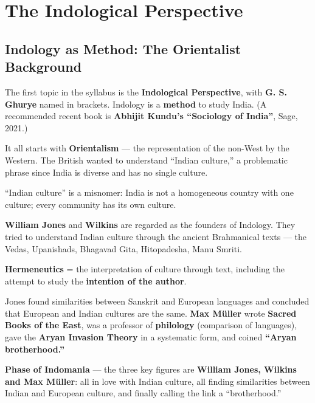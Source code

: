 \chapter{The Indological Perspective}

\section{Indology as Method: The Orientalist Background}

The first topic in the syllabus is the \textbf{Indological Perspective}, with \textbf{G. S. Ghurye} named in brackets. Indology is a \textbf{method} to study India. (A recommended recent book is \textbf{Abhijit Kundu's ``Sociology of India''}, Sage, 2021.)

It all starts with \textbf{Orientalism} --- the representation of the non-West by the Western. The British wanted to understand ``Indian culture,'' a problematic phrase since India is diverse and has no single culture.

\begin{CriticalPoint}
``Indian culture'' is a misnomer: India is not a homogeneous country with one culture; every community has its own culture.
\end{CriticalPoint}

\textbf{William Jones} and \textbf{Wilkins} are regarded as the founders of Indology. They tried to understand Indian culture through the ancient Brahmanical texts --- the Vedas, Upanishads, Bhagavad Gita, Hitopadesha, Manu Smriti.

\begin{KeyConcept}
\textbf{Hermeneutics} = the interpretation of culture through text, including the attempt to study the \textbf{intention of the author}.
\end{KeyConcept}

Jones found similarities between Sanskrit and European languages and concluded that European and Indian cultures are the same. \textbf{Max M\"uller} wrote \textbf{Sacred Books of the East}, was a professor of \textbf{philology} (comparison of languages), gave the \textbf{Aryan Invasion Theory} in a systematic form, and coined \textbf{``Aryan brotherhood.''}

\begin{KeyConcept}
\textbf{Phase of Indomania} --- the three key figures are \textbf{William Jones, Wilkins and Max M\"uller}: all in love with Indian culture, all finding similarities between Indian and European culture, and finally calling the link a ``brotherhood.''
\end{KeyConcept}


